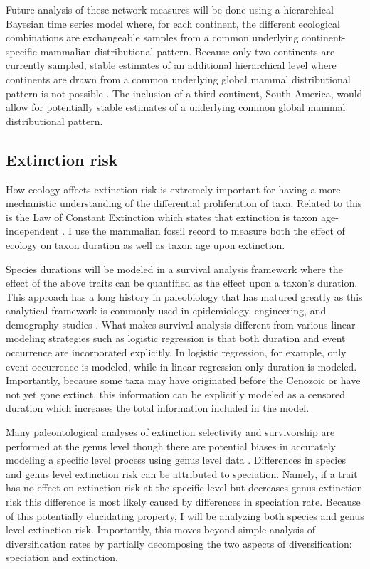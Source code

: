 \documentclass[11pt,letterpaper]{article}
\begin{document}
Future analysis of these network measures will be done using a hierarchical Bayesian time series model where, for each continent, the different ecological combinations are exchangeable samples from a common underlying continent-specific mammalian distributional pattern. Because only two continents are currently sampled, stable estimates of an additional hierarchical level where continents are drawn from a common underlying global mammal distributional pattern is not possible \citep{Gelman2013d}. The inclusion of a third continent, South America, would allow for potentially stable estimates of a underlying common global mammal distributional pattern. %

\subsection{Extinction risk}
How ecology affects extinction risk is extremely important for having a more mechanistic understanding of the differential proliferation of taxa. Related to this is the Law of Constant Extinction which states that extinction is taxon age-independent \citep{VanValen1973}. I use the mammalian fossil record to measure both the effect of ecology on taxon duration as well as taxon age upon extinction. 

Species durations will be modeled in a survival analysis framework where the effect of the above traits can be quantified as the effect upon a taxon's duration. This approach has a long history in paleobiology \citep{Simpson1944,Simpson1953,VanValen1973,VanValen1979,Baumiller1993,Foote1988} that has matured greatly as this analytical framework is commonly used in epidemiology, engineering, and demography studies \citep{Kleinbaum2005}. What makes survival analysis different from various linear modeling strategies such as logistic regression is that both duration and event occurrence are incorporated explicitly. In logistic regression, for example, only event occurrence is modeled, while in linear regression only duration is modeled. Importantly, because some taxa may have originated before the Cenozoic or have not yet gone extinct, this information can be explicitly modeled as a censored duration which increases the total information included in the model. 

Many paleontological analyses of extinction selectivity and survivorship are performed at the genus level \citep{Tomiya2013,Liow2008,Harnik2013,Finnegan2008,Foote2006} though there are potential biases in accurately modeling a specific level process using genus level data \citep{Raup1975,Sepkoski1975,Simpson2006,Raup1991a,VanValen1979}. Differences in species and genus level extinction risk can be attributed to speciation. Namely, if a trait has no effect on extinction risk at the specific level but decreases genus extinction risk this difference is most likely caused by differences in speciation rate. Because of this potentially elucidating property, I will be analyzing both species and genus level extinction risk. Importantly, this moves beyond simple analysis of diversification rates by partially decomposing the two aspects of diversification: speciation and extinction.
\end{document}
